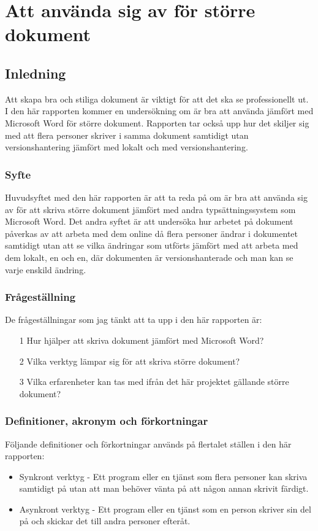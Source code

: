 \chapter{Att använda sig av \latex för större dokument}
\label{cha:indiv-report-tuhkala}

\section{Inledning}
\label{sec:introduction-tuhkala}
Att skapa bra och stiliga dokument är viktigt för att det ska se professionellt ut. I den här rapporten kommer en undersökning om \latex är bra att använda jämfört med Microsoft Word för större dokument. Rapporten tar också upp hur det skiljer sig med att flera personer skriver i samma dokument samtidigt utan versionshantering jämfört med lokalt och med versionshantering.

\subsection{Syfte}
\label{sec:purpose-tuhkala}
Huvudsyftet med den här rapporten är att ta reda på om \latex är bra att använda sig av för att skriva större dokument jämfört med andra typsättningssystem som Microsoft Word. Det andra syftet är att undersöka hur arbetet på dokument påverkas av att arbeta med dem online då flera personer ändrar i dokumentet samtidigt utan att se vilka ändringar som utförts jämfört med att arbeta med dem lokalt, en och en, där dokumenten är versionshanterade och man kan se varje enskild ändring.

\subsection{Frågeställning}
\label{sec:issue-tuhkala}
De frågeställningar som jag tänkt att ta upp i den här rapporten är:

\begin{itemize}
	\item [1] Hur hjälper \latex att skriva dokument jämfört med Microsoft Word?
	\item [2] Vilka verktyg lämpar sig för att skriva större dokument?
	\item [3] Vilka erfarenheter kan tas med ifrån det här projektet gällande större dokument?
\end{itemize}

\subsection{Definitioner, akronym och förkortningar}
Följande definitioner och förkortningar används på flertalet ställen i den här rapporten:
\begin{itemize}
	\item Synkront verktyg - Ett program eller en tjänst som flera personer kan skriva samtidigt på utan att man behöver vänta på att någon annan skrivit färdigt.
	\item Asynkront verktyg - Ett program eller en tjänst som en person skriver sin del på och skickar det till andra personer efteråt.
\end{itemize}


